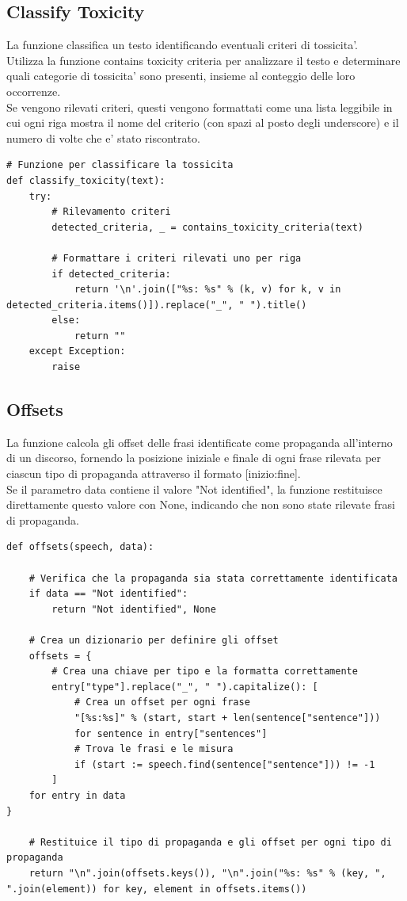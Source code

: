 \documentclass{article}
\begin{document}
		\subsection{Classify Toxicity}
La funzione  classifica un testo identificando eventuali criteri di tossicita'. \\Utilizza la funzione contains toxicity criteria per analizzare il testo e determinare quali categorie di tossicita' sono presenti, insieme al conteggio delle loro occorrenze.\\
Se vengono rilevati criteri, questi vengono formattati come una lista leggibile in cui ogni riga mostra il nome del criterio (con spazi al posto degli underscore) e il numero di volte che e' stato riscontrato.
	\begin{lstlisting}
# Funzione per classificare la tossicita
def classify_toxicity(text):
	try:
		# Rilevamento criteri
		detected_criteria, _ = contains_toxicity_criteria(text)

		# Formattare i criteri rilevati uno per riga
		if detected_criteria:
			return '\n'.join(["%s: %s" % (k, v) for k, v in detected_criteria.items()]).replace("_", " ").title()
		else:
			return ""
	except Exception:
		raise
	\end{lstlisting}
		\subsection{Offsets}	
La funzione calcola gli offset delle frasi identificate come propaganda all'interno di un discorso, fornendo la posizione iniziale e finale di ogni frase rilevata per ciascun tipo di propaganda attraverso il formato [inizio:fine].\\
Se il parametro data contiene il valore "Not identified", la funzione restituisce direttamente questo valore con None, indicando che non sono state rilevate frasi di propaganda.		
	\begin{lstlisting}
def offsets(speech, data):

	# Verifica che la propaganda sia stata correttamente identificata
	if data == "Not identified":
		return "Not identified", None

	# Crea un dizionario per definire gli offset
	offsets = {
		# Crea una chiave per tipo e la formatta correttamente 
		entry["type"].replace("_", " ").capitalize(): [
			# Crea un offset per ogni frase
			"[%s:%s]" % (start, start + len(sentence["sentence"]))
			for sentence in entry["sentences"]
			# Trova le frasi e le misura
			if (start := speech.find(sentence["sentence"])) != -1
		]
	for entry in data
}

	# Restituice il tipo di propaganda e gli offset per ogni tipo di propaganda
	return "\n".join(offsets.keys()), "\n".join("%s: %s" % (key, ", ".join(element)) for key, element in offsets.items())
	\end{lstlisting}
\end{document}
